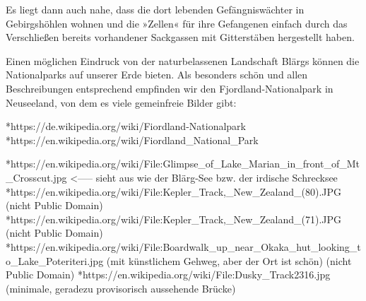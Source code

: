 \cleardoubleoddpage

%

\cleardoubleoddpage

%

\cleardoubleoddpage

%

\cleardoubleoddpage

%

\cleardoubleoddpage

%

\cleardoubleoddpage

%

\cleardoubleoddpage

%

\cleardoubleoddpage

%

\cleardoubleoddpage

%

\cleardoubleoddpage

%

\cleardoubleoddpage

Es liegt dann auch nahe, dass die dort lebenden Gefängniswächter in Gebirgshöhlen wohnen und die »Zellen« für ihre Gefangenen einfach durch das Verschließen bereits vorhandener Sackgassen mit Gitterstäben hergestellt haben.

Einen möglichen Eindruck von der naturbelassenen Landschaft Blärgs können die Nationalparks auf unserer Erde bieten. Als besonders schön und allen Beschreibungen entsprechend empfinden wir den Fjordland-Nationalpark in Neuseeland, von dem es viele gemeinfreie Bilder gibt:

*https://de.wikipedia.org/wiki/Fiordland-Nationalpark
*https://en.wikipedia.org/wiki/Fiordland_National_Park

*https://en.wikipedia.org/wiki/File:Glimpse_of_Lake_Marian_in_front_of_Mt_Crosscut.jpg   <----- sieht aus wie der Blärg-See bzw. der irdische Schrecksee
*https://en.wikipedia.org/wiki/File:Kepler_Track,_New_Zealand_(80).JPG (nicht Public Domain)
*https://en.wikipedia.org/wiki/File:Kepler_Track,_New_Zealand_(71).JPG (nicht Public Domain)
*https://en.wikipedia.org/wiki/File:Boardwalk_up_near_Okaka_hut_looking_to_Lake_Poteriteri.jpg (mit künstlichem Gehweg, aber der Ort ist schön) (nicht Public Domain)
*https://en.wikipedia.org/wiki/File:Dusky_Track2316.jpg (minimale, geradezu provisorisch aussehende Brücke)

